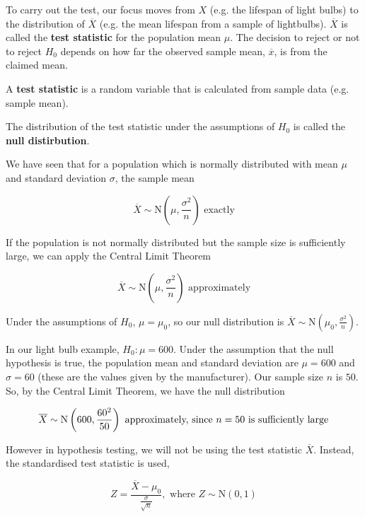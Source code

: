 \documentclass[11pt,a4paper]{book}
\begin{document}
To carry out the test, our focus moves from $X$ (e.g. the lifespan
of light bulbs) to the distribution of $\overline{X}$ (e.g. the mean
lifespan from a sample of lightbulbs). $\overline{X}$ is called the
\textbf{test statistic} for the population mean $\mu$. The decision
to reject or not to reject $H_{0}$ depends on how far the observed
sample mean, $\overline{x}$, is from the claimed mean.

\begin{tcolorbox}[colback=blue!5, colframe=black, boxrule=.4pt, sharpish corners]

A \textbf{test statistic} is a random variable that is calculated
from sample data (e.g. sample mean).

\medskip

The distribution of the test statistic under the assumptions of $H_{0}$
is called the \textbf{null distirbution}.
\end{tcolorbox}

We have seen that for a population which is normally distributed with
mean $\mu$ and standard deviation $\sigma$, the sample mean

\[
\overline{X}\sim\text{N}\left(\mu,\frac{\sigma^{2}}{n}\right)\text{ exactly}
\]

If the population is not normally distributed but the sample size
is sufficiently large, we can apply the Central Limit Theorem

\[
\overline{X}\sim\text{N}\left(\mu,\frac{\sigma^{2}}{n}\right)\text{ approximately}
\]

Under the assumptions of $H_{0}$, $\mu=\mu_{0}$, so our null distribution
is ${\displaystyle \overline{X}\sim\text{N}\left(\mu_{0},\frac{\sigma^{2}}{n}\right)}$.

In our light bulb example, $H_{0}:\mu=600$. Under the assumption
that the null hypothesis is true, the population mean and standard
deviation are $\mu=600$ and $\sigma=60$ (these are the values given
by the manufacturer). Our sample size $n$ is $50$. So, by the Central
Limit Theorem, we have the null distribution

\[
\overline{X}\sim\text{N}\left(600,\frac{60^{2}}{50}\right)\text{ approximately, since \ensuremath{n=50} is sufficiently large}
\]

However in hypothesis testing, we will not be using the test statistic
$\overline{X}$. Instead, the standardised test statistic is used,

\[
Z=\frac{\overline{X}-\mu_{0}}{\frac{\sigma}{\sqrt{n}}},\text{ where }Z\sim\text{N}\left(0,1\right)
\]
\end{document}

